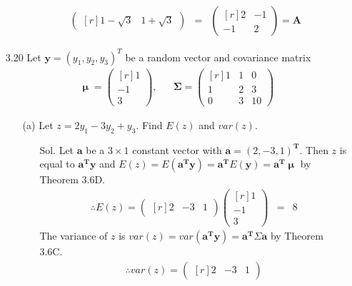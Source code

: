 \documentclass[12pt]{article} %
\begin{document}
\begin{enumerate}
\begin{enumerate}
\begin{eqnarray*}
\begin{pmatrix}[r]
		  1-\sqrt{3} & 1+\sqrt{3} 
		  \end{pmatrix}
		&=&
		\begin{pmatrix}[r]
			 2 & -1 \\
			-1 & 2  
		\end{pmatrix}
		=\mathbf{A}		
		\end{eqnarray*}				   		
	\end{enumerate}
\item[3.20] Let $\mathbf{y}=(y_{1},y_{2},y_{3})^{T}$ be a random vector and covariance matrix	
	\begin{eqnarray*}
		\mathbf{\upmu}=
		\begin{pmatrix}[r]
			 1 \\
				   -1 \\
			 3	
		\end{pmatrix},
		&&
		\mathbf{\Sigma}=
		\begin{pmatrix}[r]
			1 & 1 & 0 \\
			1 & 2 & 3 \\
			0 & 3 & 10 
		\end{pmatrix}
	\end{eqnarray*}
	\begin{enumerate}
		\item[(a)] Let $z=2y_{1}-3y_{2}+y_{3}$. Find $E(z)$ and $var(z)$. 
			\begin{enumerate}
				\item[Sol.] Let $\mathbf{a}$ be a $3 \times 1$ constant vector with 
				$\mathbf{a}=(2, -3, 1)^\mathbf{{T}}$. Then $z$ is equal to $\mathbf{a^{T}}\mathbf{y}$ and 
				$E(z)=E(\mathbf{a^{T}y})=\mathbf{a^{T}}E(\mathbf{y})=\mathbf{a^{T}}\mathbf{\upmu}$ by 
				Theorem 3.6D.  
				\begin{eqnarray*}
					\therefore E(z)=
					\begin{pmatrix}[r]
						2 & -3 & 1
					\end{pmatrix}
					\begin{pmatrix}[r]
						 1 \\
							   -1 \\
						 3	
					\end{pmatrix}
					&=&8					
				\end{eqnarray*}
				The variance of $z$ is $var(z)=var(\mathbf{a^{T}y})=\mathbf{a^{T}}\Sigma\mathbf{a}$ by Theorem 3.6C. 
				\begin{eqnarray*}
					\therefore var(z)=
					\begin{pmatrix}[r]
						2 & -3 & 1
					\end{pmatrix}

\end{eqnarray*}
\end{enumerate}
\end{enumerate}
\end{enumerate}
\end{document}
